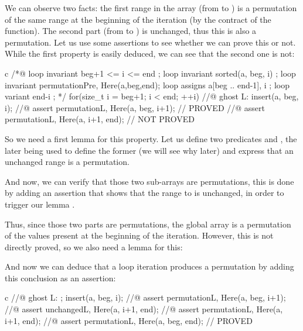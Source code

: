 We can observe two facts: the first range in the array (from  to
) is a permutation of the same range at the beginning of the
iteration (by the contract of the  function). The second part
(from  to ) is unchanged, thus this is also a
permutation. Let us use some assertions to see whether we can prove this or not.
While the first property is easily deduced, we can see that the second one is
not:



\begin{CodeBlock}{c}
  /*@
    loop invariant beg+1 <= i <= end ;
    loop invariant sorted(a, beg, i) ;
    loop invariant permutation{Pre, Here}(a,beg,end);
    loop assigns a[beg .. end-1], i ;
    loop variant end-i ;
  */
  for(size_t i = beg+1; i < end; ++i) {
    //@ ghost L:
    insert(a, beg, i);
    //@ assert permutation{L, Here}(a, beg, i+1); // PROVED
    //@ assert permutation{L, Here}(a, i+1, end); // NOT PROVED
  }
\end{CodeBlock}


So we need a first lemma for this property. Let us define two predicates
 and , the later being used to
define the former (we will see why later) and express that an unchanged
range is a permutation.





And now, we can verify that those two sub-arrays are permutations, this is done
by adding an assertion that shows that the range  to
 is unchanged, in order to trigger our lemma
.




Thus, since those two parts are permutations, the global array is a permutation
of the values present at the beginning of the iteration. However, this is not
directly proved, so we also need a lemma for this:





And now we can deduce that a loop iteration produces a permutation by adding
this conclusion as an assertion:



\begin{CodeBlock}{c}
    //@ ghost L: ;
    insert(a, beg, i);
    //@ assert permutation{L, Here}(a, beg, i+1);
    //@ assert unchanged{L, Here}(a, i+1, end);
    //@ assert permutation{L, Here}(a, i+1, end);
    //@ assert permutation{L, Here}(a, beg, end); // PROVED
\end{CodeBlock}



